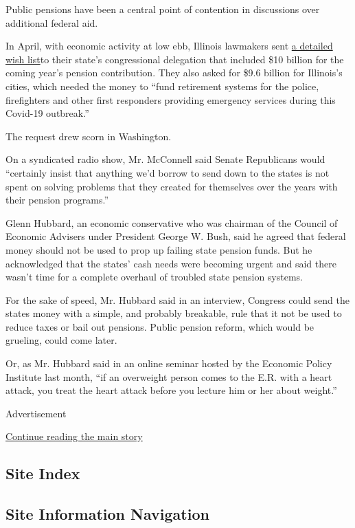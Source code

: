 Public pensions have been a central point of contention in discussions
over additional federal aid.

In April, with economic activity at low ebb, Illinois lawmakers sent
\href{https://www.nytimes3xbfgragh.onion/2020/04/17/business/dealbook/illinois-pension-coronavirus.html}{a
detailed wish list}to their state's congressional delegation that
included \$10 billion for the coming year's pension contribution. They
also asked for \$9.6 billion for Illinois's cities, which needed the
money to ``fund retirement systems for the police, firefighters and
other first responders providing emergency services during this Covid-19
outbreak.''

The request drew scorn in Washington.

On a syndicated radio show, Mr. McConnell said Senate Republicans would
``certainly insist that anything we'd borrow to send down to the states
is not spent on solving problems that they created for themselves over
the years with their pension programs.''

Glenn Hubbard, an economic conservative who was chairman of the Council
of Economic Advisers under President George W. Bush, said he agreed that
federal money should not be used to prop up failing state pension funds.
But he acknowledged that the states' cash needs were becoming urgent and
said there wasn't time for a complete overhaul of troubled state pension
systems.

For the sake of speed, Mr. Hubbard said in an interview, Congress could
send the states money with a simple, and probably breakable, rule that
it not be used to reduce taxes or bail out pensions. Public pension
reform, which would be grueling, could come later.

Or, as Mr. Hubbard said in an online seminar hosted by the Economic
Policy Institute last month, ``if an overweight person comes to the E.R.
with a heart attack, you treat the heart attack before you lecture him
or her about weight.''

Advertisement

\protect\hyperlink{after-bottom}{Continue reading the main story}

\hypertarget{site-index}{%
\subsection{Site Index}\label{site-index}}

\hypertarget{site-information-navigation}{%
\subsection{Site Information
Navigation}\label{site-information-navigation}}

